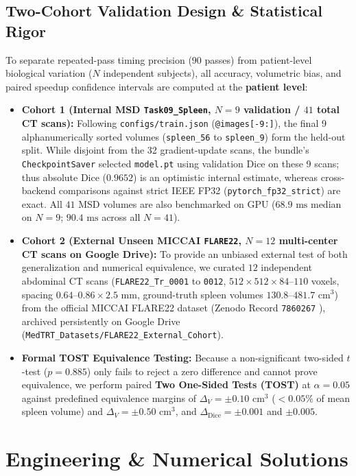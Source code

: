 \documentclass[10pt,twocolumn]{article}
\begin{document}
\subsection{Two-Cohort Validation Design \& Statistical Rigor}
To separate repeated-pass timing precision ($90$ passes) from patient-level biological variation ($N$ independent subjects), all accuracy, volumetric bias, and paired speedup confidence intervals are computed at the \textbf{patient level}:
\begin{itemize}
    \item \textbf{Cohort 1 (Internal MSD \texttt{Task09\_Spleen}, $N = 9$ validation / $41$ total CT scans):} Following \texttt{configs/train.json} (\texttt{@images[-9:]}), the final 9 alphanumerically sorted volumes (\texttt{spleen\_56} to \texttt{spleen\_9}) form the held-out split. While disjoint from the 32 gradient-update scans, the bundle's \texttt{CheckpointSaver} selected \texttt{model.pt} using validation Dice on these 9 scans; thus absolute Dice ($0.9652$) is an optimistic internal estimate, whereas cross-backend comparisons against strict IEEE FP32 (\texttt{pytorch\_fp32\_strict}) are exact. All $41$ MSD volumes are also benchmarked on GPU ($68.9\text{ ms}$ median on $N=9$; $90.4\text{ ms}$ across all $N=41$).
    \item \textbf{Cohort 2 (External Unseen MICCAI \texttt{FLARE22}, $N = 12$ multi-center CT scans on Google Drive):} To provide an unbiased external test of both generalization and numerical equivalence, we curated $12$ independent abdominal CT scans (\texttt{FLARE22\_Tr\_0001} to \texttt{0012}, $512 \times 512 \times 84\text{--}110$ voxels, spacing $0.64\text{--}0.86 \times 2.5\text{ mm}$, ground-truth spleen volumes $130.8\text{--}481.7\text{ cm}^3$) from the official MICCAI FLARE22 dataset (Zenodo Record \texttt{7860267} \cite{ma2023flare}), archived persistently on Google Drive (\texttt{MedTRT\_Datasets/FLARE22\_External\_Cohort}).
    \item \textbf{Formal TOST Equivalence Testing:} Because a non-significant two-sided $t$-test ($p = 0.885$) only fails to reject a zero difference and cannot prove equivalence, we perform paired \textbf{Two One-Sided Tests (TOST)} \cite{schuirmann1987} at $\alpha = 0.05$ against predefined equivalence margins of $\Delta_V = \pm 0.10\text{ cm}^3$ ($< 0.05\%$ of mean spleen volume) and $\Delta_V = \pm 0.50\text{ cm}^3$, and $\Delta_{\text{Dice}} = \pm 0.001$ and $\pm 0.005$.
\end{itemize}

\section{Engineering \& Numerical Solutions}
\end{document}
